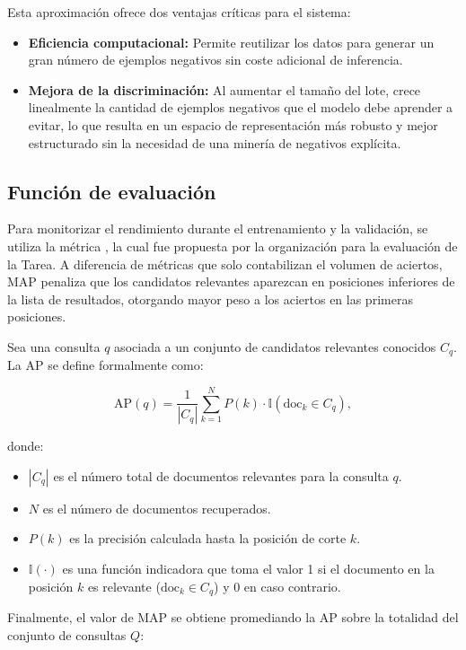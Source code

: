 Esta aproximación ofrece dos ventajas críticas para el sistema:
\begin{itemize}
    \item \textbf{Eficiencia computacional:} Permite reutilizar los datos para generar un gran número de ejemplos negativos sin coste adicional de inferencia.
    \item \textbf{Mejora de la discriminación:} Al aumentar el tamaño del lote, crece linealmente la cantidad de ejemplos negativos que el modelo debe aprender a evitar, lo que resulta en un espacio de representación más robusto y mejor estructurado sin la necesidad de una minería de negativos explícita.
\end{itemize}

\subsection{Función de evaluación}
\label{sec:MAP}

\noindent Para monitorizar el rendimiento durante el entrenamiento y la validación, se utiliza la métrica , la cual fue propuesta por la organización para la evaluación de la \gls{Tarea}. A diferencia de métricas que solo contabilizan el volumen de aciertos, \gls{MAP} penaliza que los candidatos relevantes aparezcan en posiciones inferiores de la lista de resultados, otorgando mayor peso a los aciertos en las primeras posiciones.

Sea una consulta \( q \) asociada a un conjunto de candidatos relevantes conocidos \( C_q \). La \gls{AP} se define formalmente como:

\[
    \mathrm{AP}(q) = \frac{1}{|C_q|} \sum_{k=1}^{N} P(k) \cdot \mathbb{I}(\text{doc}_k \in C_q),
\]

donde:
\begin{itemize}
    \item \( |C_q| \) es el número total de documentos relevantes para la consulta \( q \).
    \item \( N \) es el número de documentos recuperados.
    \item \( P(k) \) es la precisión calculada hasta la posición de corte \( k \).
    \item \( \mathbb{I}(\cdot) \) es una función indicadora que toma el valor 1 si el documento en la posición \( k \) es relevante (\( \text{doc}_k \in C_q \)) y 0 en caso contrario.
\end{itemize}

Finalmente, el valor de \gls{MAP} se obtiene promediando la \gls{AP} sobre la totalidad del conjunto de consultas \( Q \):

